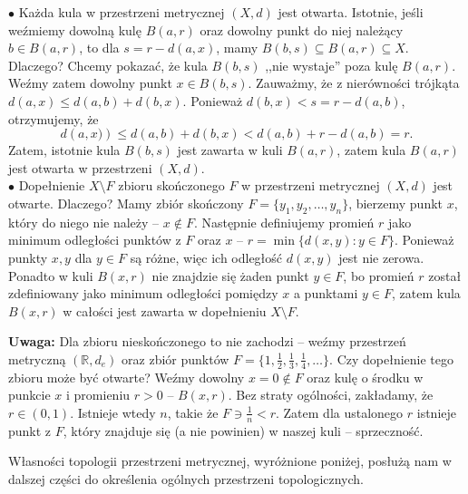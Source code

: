 \begin{remark}
	\noindent$\bullet$ Każda kula w przestrzeni metrycznej $\left( X,d \right) $ jest otwarta. Istotnie, jeśli weźmiemy dowolną kulę $B\left( a,r \right) $ oraz dowolny punkt do niej należący $b\in B\left( a,r \right) $, to dla $s = r - d\left( a,x \right) $, mamy $B\left( b,s \right) \subseteq B\left( a,r \right) \subseteq X$. Dlaczego? Chcemy pokazać, że kula $B\left( b,s \right) $ ,,nie wystaje'' poza kulę $B\left( a,r \right) $. Weźmy zatem dowolny punkt $x \in B\left( b,s \right) $. Zauważmy, że z nierówności trójkąta $d\left( a,x \right) \le d\left( a,b \right) + d\left( b,x \right) $. Ponieważ $d\left( b,x \right) < s = r - d\left( a,b \right) $, otrzymujemy, że
	\[
	d\left( a,x) \right) \le  d\left( a,b \right) + d\left( b,x \right) < d\left( a,b \right) + r - d\left( a,b \right) = r
	.\] 
Zatem, istotnie kula $B\left( b,s \right) $ jest zawarta w kuli $B\left( a,r \right) $, zatem kula $B\left( a,r \right) $ jest otwarta w przestrzeni $\left( X,d \right) $.\\
\noindent$\bullet$ Dopełnienie $X\setminus F$ zbioru skończonego $F$ w przestrzeni metrycznej $\left( X,d \right) $ jest otwarte. Dlaczego?
Mamy zbiór skończony $F = \{y_1,y_2,\ldots, y_{n}\} $, bierzemy punkt $x$, który do niego nie należy -- $x \not\in F$. Następnie definiujemy promień $r$ jako minimum odległości punktów z $F$ oraz  $x$ -- $r = \min \{d\left( x,y \right) : y \in F\} $. Ponieważ punkty $x,y$ dla $y \in F$ są różne, więc ich odległość $d\left( x,y \right) $ jest nie zerowa. Ponadto w kuli $B\left( x,r \right) $ nie znajdzie się żaden punkt $y \in F$, bo promień $r$ został zdefiniowany jako minimum odległości pomiędzy $x$ a punktami $y \in F$, zatem kula  $B\left( x,r \right) $ w całości jest zawarta w dopełnieniu  $X\setminus F$.

\noindent \textbf{Uwaga:} Dla zbioru nieskończonego to nie zachodzi -- weźmy przestrzeń metryczną $\left( \mathbb{R}, d_{e} \right) $ oraz zbiór punktów $F = \{1, \frac{1}{2}, \frac{1}{3}, \frac{1}{4}, \ldots\}$. Czy dopełnienie tego zbioru może być otwarte? Weźmy dowolny $x = 0 \not\in F$ oraz kulę o środku w punkcie $x$ i promieniu $r > 0$ --  $B\left( x,r \right) $. Bez straty ogólności, zakładamy, że $r \in \left( 0,1 \right) $. Istnieje wtedy $n$, takie że $F \ni \frac{1}{n} < r$. Zatem dla ustalonego $r$ istnieje punkt z $F$, który znajduje się (a nie powinien) w naszej kuli -- sprzeczność.
\end{remark} 

Własności topologii przestrzeni metrycznej, wyróżnione poniżej, posłużą nam w dalszej części do określenia ogólnych przestrzeni topologicznych.

